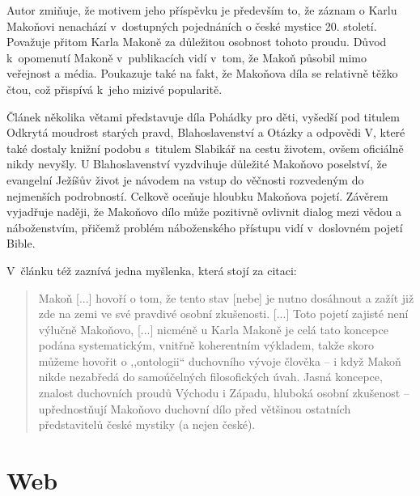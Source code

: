 Autor zmiňuje, že motivem jeho příspěvku je především to, že záznam o Karlu Makoňovi
nenachází v~dostupných pojednáních o české mystice 20. století. Považuje přitom
Karla Makoně za důležitou osobnost tohoto proudu. Důvod k~opomenutí Makoně
v~publikacích vidí v~tom, že Makoň působil mimo veřejnost a média. Poukazuje
také na fakt, že Makoňova díla se relativně těžko čtou, což přispívá k~jeho
mizivé popularitě.

Článek několika větami představuje díla Pohádky pro děti, vyšedší pod titulem
Odkrytá moudrost starých pravd,\cite{makon1992odkryta}
Blahoslavenství\cite{makon2000blahoslavenstvi} a Otázky a odpovědi V, které
také dostaly knižní podobu s~titulem Slabikář na cestu životem, ovšem oficiálně
nikdy nevyšly. U Blahoslavenství vyzdvihuje důležité Makoňovo poselství, že
evangelní Ježíšův život je návodem na vstup do věčnosti rozvedeným do nejmenších
podrobností. Celkově oceňuje hloubku Makoňova pojetí. Závěrem vyjadřuje naději,
že Makoňovo dílo může pozitivně ovlivnit dialog mezi vědou a náboženstvím,
přičemž problém náboženského přístupu vidí v~doslovném pojetí Bible.

V~článku též zaznívá jedna myšlenka, která stojí za citaci:
\begin{quote}
Makoň [...] hovoří o tom, že tento stav [nebe] je
nutno dosáhnout a zažít již zde na zemi ve
své pravdivé osobní zkušenosti. [...]
Toto pojetí zajisté není výlučně Makoňovo, [...]
nicméně u Karla Makoně je celá tato koncepce podána systematickým, vnitřně
koherentním výkladem, takže skoro můžeme hovořit o ,,ontologii`` duchovního
vývoje člověka -- i když Makoň nikde nezabředá do samoúčelných filosofických
úvah. Jasná koncepce, znalost duchovních proudů Východu i Západu, hluboká osobní
zkušenost -- upřednostňují Makoňovo duchovní dílo před většinou ostatních
představitelů české mystiky (a nejen české).
\end{quote}

\section{Web}

